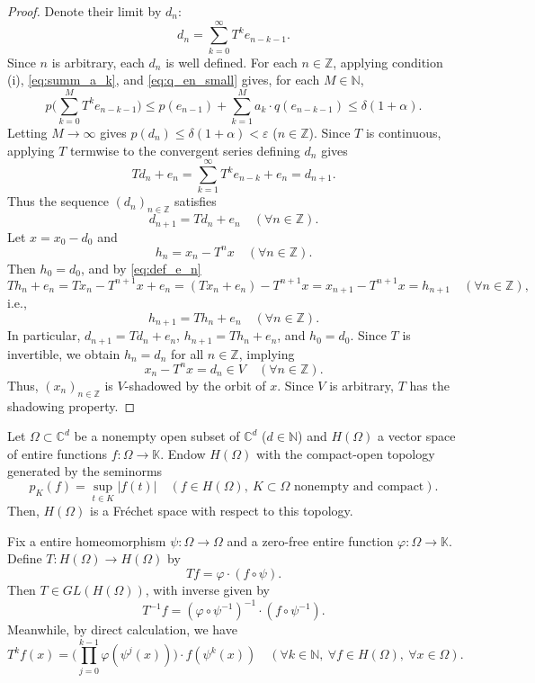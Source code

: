\documentclass[11pt]{amsart}
\theoremstyle{definition}
\theoremstyle{remark}
\theoremstyle{plain}
\begin{document}
\begin{proof}
Denote their limit by
\(d_n\):
\[
d_n=\sum_{k=0}^{\infty}T^k e_{n-k-1}.
\]
Since \(n\) is arbitrary, each \(d_n\) is well defined.
For each \(n\in\mathbb{Z}\), applying condition {\rm (i)}, \eqref{eq:summ_a_k},
and \eqref{eq:q_en_small} gives, for each
\(M\in\mathbb{N}\),
\[
p\bigg(\sum_{k=0}^{M}T^k e_{n-k-1}\bigg)
\le
p(e_{n-1})+\sum_{k=1}^{M}a_k\cdot q(e_{n-k-1})
\le
\delta(1+\alpha) .
\]
Letting \(M\to\infty\) gives \(p(d_n)\le \delta(1+\alpha)<\varepsilon\)
($n\in \mathbb{Z}$).
Since \(T\) is continuous, applying \(T\) termwise to the convergent series
defining \(d_n\) gives
\[
Td_n+e_n
=
\sum_{k=1}^{\infty}T^k e_{n-k}+e_n
=d_{n+1}.
\]
Thus the sequence \((d_n)_{n\in\mathbb{Z}}\) satisfies
\[
d_{n+1}=Td_n+e_n
\quad(\forall n\in\mathbb{Z}).
\]
Let \(x=x_0-d_0\) and
\[
h_n=x_n-T^n x
\quad(\forall n\in\mathbb{Z}).
\]
Then \(h_0=d_0\), and by \eqref{eq:def_e_n}
\[
Th_n+e_n=Tx_n-T^{n+1}x+e_n=(Tx_n+e_n)-T^{n+1}x=x_{n+1}-
T^{n+1}x=h_{n+1}
\quad(\forall n\in\mathbb{Z}),
\]
i.e.,
\[
h_{n+1}=Th_n+e_n
\quad(\forall n\in\mathbb{Z}).
\]
In particular,
\(d_{n+1}=Td_n+e_n\),
\(h_{n+1}=Th_n+e_n\),
and $h_0=d_0$. Since \(T\) is
invertible, we obtain \(h_n=d_n\) for all
\(n\in\mathbb{Z}\), implying
\[
x_n-T^n x=d_n\in V
\quad(\forall n\in\mathbb{Z}).
\]
Thus, \((x_n)_{n\in\mathbb{Z}}\) is
\(V\)-shadowed by the orbit of \(x\).
Since \(V\) is arbitrary,
\(T\) has the shadowing property.
\end{proof}

Let $\Omega\subset \mathbb{C}^d$ be
a nonempty open subset of $\mathbb{C}^d$ ($d\in \mathbb{N}$)
and $H(\Omega)$ a vector space of entire functions
\(f:\Omega\to\mathbb{K}\). Endow \(H(\Omega)\) with the
compact-open topology generated by the seminorms
\[
p_K(f)=\sup_{t\in K}|f(t)|
\quad(f\in H(\Omega),\ K\subset\Omega\text{ nonempty and compact}).
\]
Then, $H(\Omega)$ is a Fr\'{e}chet space with respect to this topology.


Fix a entire homeomorphism \(\psi:\Omega\to\Omega\) and a zero-free
entire function \(\varphi:\Omega\to\mathbb{K}\).
Define $T: H(\Omega)\to H(\Omega)$ by
\begin{equation}\label{eq:weighted-composition-operator}
Tf=\varphi\cdot(f\circ\psi).
\end{equation}
Then \(T\in GL(H(\Omega))\),
with inverse given by
\[
T^{-1}f
=
(\varphi\circ\psi^{-1})^{-1}\cdot(f\circ\psi^{-1}).
\]
Meanwhile, by direct calculation, we have
\begin{equation}\label{eq:Iterated-weighted-composition-operator}
T^kf(x)=\bigg(\prod_{j=0}^{k-1}\varphi(\psi^j(x))\bigg)\cdot f(\psi^k(x))\quad
(\forall k\in \mathbb{N},\
\forall f\in H(\Omega),\ \forall x\in \Omega).
\end{equation}
\end{document}
